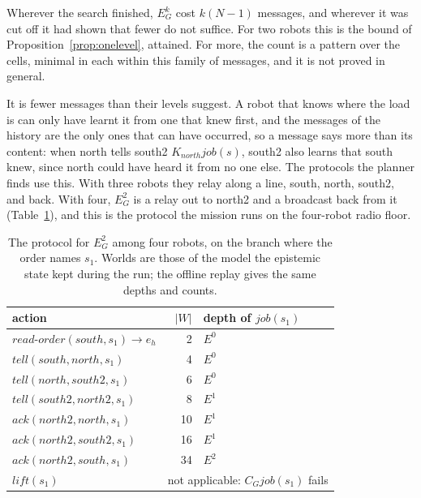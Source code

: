 \documentclass[11pt,a4paper]{article}
\theoremstyle{definition}
\newcommand{\Kop}[1]{K_{#1}}
\newcommand{\Eop}[1]{E_{#1}}
\newcommand{\Cop}[1]{C_{#1}}
\newcommand{\ag}[1]{\mathit{#1}}
\newcommand{\job}{\mathit{job}}
\begin{document}
\noindent
Wherever the search finished, $\Eop{G}^k$ cost $k(N-1)$ messages, and wherever
it was cut off it had shown that fewer do not suffice. For two robots this is
the bound of Proposition~\ref{prop:onelevel}, attained. For more, the count is
a pattern over the cells, minimal in each within this family of messages, and
it is not proved in general.

It is fewer messages than their levels suggest. A robot that knows where the
load is can only have learnt it from one that knew first, and the messages of
the history are the only ones that can have occurred, so a message says more
than its content: when north tells south2 $\Kop{\ag{north}}\job(s)$, south2
also learns that south knew, since north could have heard it from no one else.
The protocols the planner finds use this. With three robots they relay along a
line, south, north, south2, and back. With four, $\Eop{G}^2$ is a relay out to
north2 and a broadcast back from it (Table~\ref{tab:protocol}), and this is the
protocol the mission runs on the four-robot radio floor.

\begin{table}[H]
\centering\small
\caption{The protocol for $\Eop{G}^2$ among four robots, on the branch where
the order names $s_1$. Worlds are those of the model the epistemic state kept
during the run; the offline replay gives the same depths and counts.}
\label{tab:protocol}
\begin{tabular}{@{}l r l@{}}
\toprule
action & $|W|$ & depth of $\job(s_1)$ \\
\midrule
$\mathit{read\text{-}order}(\ag{south}, s_1) \to e_h$ & 2 & $E^0$ \\
$\mathit{tell}(\ag{south}, \ag{north}, s_1)$ & 4 & $E^0$ \\
$\mathit{tell}(\ag{north}, \ag{south2}, s_1)$ & 6 & $E^0$ \\
$\mathit{tell}(\ag{south2}, \ag{north2}, s_1)$ & 8 & $E^1$ \\
$\mathit{ack}(\ag{north2}, \ag{north}, s_1)$ & 10 & $E^1$ \\
$\mathit{ack}(\ag{north2}, \ag{south2}, s_1)$ & 16 & $E^1$ \\
$\mathit{ack}(\ag{north2}, \ag{south}, s_1)$ & 34 & $E^2$ \\
$\mathit{lift}(s_1)$ & \multicolumn{2}{l}{not applicable: $\Cop{G}\job(s_1)$ fails} \\
\bottomrule
\end{tabular}
\end{table}
\end{document}
